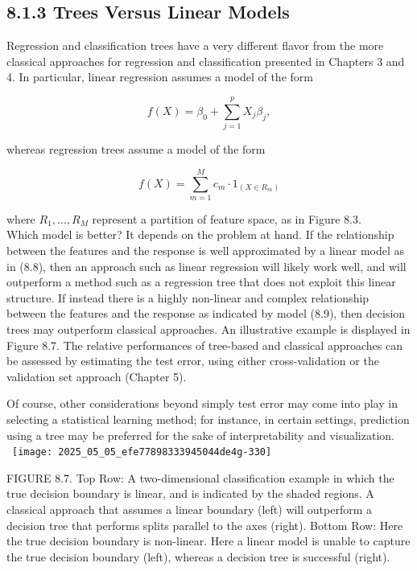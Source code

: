 \documentclass[10pt]{article}
\begin{document}
\subsection*{8.1.3 Trees Versus Linear Models}
Regression and classification trees have a very different flavor from the more classical approaches for regression and classification presented in Chapters 3 and 4. In particular, linear regression assumes a model of the form


\begin{equation*}
f(X)=\beta_{0}+\sum_{j=1}^{p} X_{j} \beta_{j}, \tag{8.8}
\end{equation*}


whereas regression trees assume a model of the form


\begin{equation*}
f(X)=\sum_{m=1}^{M} c_{m} \cdot 1_{\left(X \in R_{m}\right)} \tag{8.9}
\end{equation*}


where $R_{1}, \ldots, R_{M}$ represent a partition of feature space, as in Figure 8.3.\\
Which model is better? It depends on the problem at hand. If the relationship between the features and the response is well approximated by a linear model as in (8.8), then an approach such as linear regression will likely work well, and will outperform a method such as a regression tree that does not exploit this linear structure. If instead there is a highly non-linear and complex relationship between the features and the response as indicated by model (8.9), then decision trees may outperform classical approaches. An illustrative example is displayed in Figure 8.7. The relative performances of tree-based and classical approaches can be assessed by estimating the test error, using either cross-validation or the validation set approach (Chapter 5).

Of course, other considerations beyond simply test error may come into play in selecting a statistical learning method; for instance, in certain settings, prediction using a tree may be preferred for the sake of interpretability and visualization.\
\
\texttt{[image: 2025\_05\_05\_efe77898333945044de4g-330]}

FIGURE 8.7. Top Row: A two-dimensional classification example in which the true decision boundary is linear, and is indicated by the shaded regions. A classical approach that assumes a linear boundary (left) will outperform a decision tree that performs splits parallel to the axes (right). Bottom Row: Here the true decision boundary is non-linear. Here a linear model is unable to capture the true decision boundary (left), whereas a decision tree is successful (right).
\end{document}
